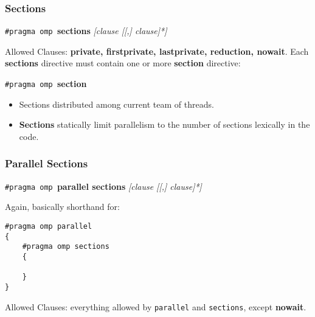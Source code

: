 \documentclass[aspectratio=43]{beamer}
\newenvironment{changemargin}[1]{%
  \begin{list}{}{%
    \setlength{\topsep}{0pt}%
    \setlength{\leftmargin}{#1}%
    \setlength{\rightmargin}{1em}
    \setlength{\listparindent}{\parindent}%
    \setlength{\itemindent}{\parindent}%
    \setlength{\parsep}{\parskip}%
  }%
  \item[]}{\end{list}}
\begin{document}
\begin{frame}[fragile]
  \frametitle{Sections}

  \begin{changemargin}{2cm}
  \begin{center}
    {\tt \#pragma omp }{\bf sections} {\it [clause [[,] clause]*]}
  \end{center}

  Allowed Clauses: {\bf private, firstprivate, lastprivate, reduction, nowait}.
  \vfill
  Each {\bf sections} directive must contain one or more {\bf section} directive:
  \begin{center}
    {\tt \#pragma omp }{\bf section}
  \end{center}
  \vfill
  
  \begin{itemize}
    \item Sections distributed among current team of threads.
    \item {\bf Sections} statically limit parallelism to the number of
      sections lexically in the code.
  \end{itemize}
  \end{changemargin}

\end{frame}

\begin{frame}[fragile]
  \frametitle{Parallel Sections}

  \begin{changemargin}{2.5cm}

  \begin{center}
    {\tt \#pragma omp }{\bf parallel sections} {\it [clause [[,] clause]*]}
  \end{center}
  \vfill
  Again, basically shorthand for:
  
  \begin{lstlisting}
#pragma omp parallel
{
    #pragma omp sections
    {

    }
}
  \end{lstlisting}
  \vfill
  Allowed Clauses: everything allowed by {\tt parallel} and {\tt sections}, except
  {\bf nowait}.
  \end{changemargin}

\end{frame}
\end{document}

